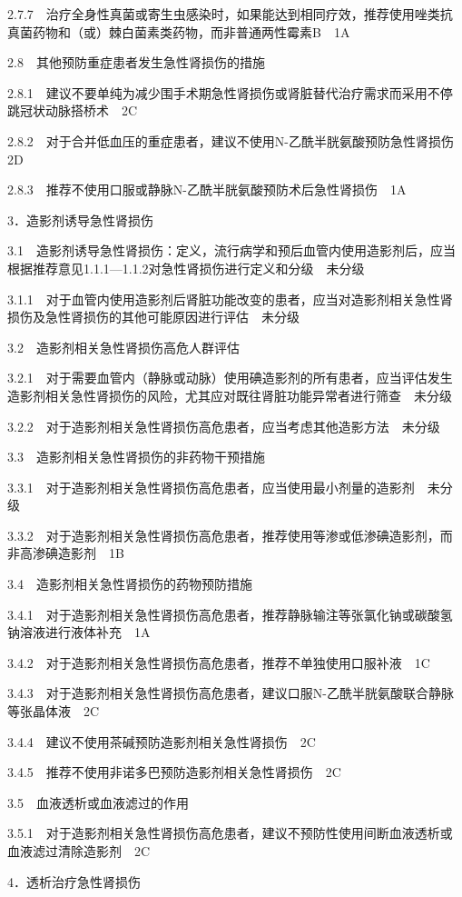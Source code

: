 2.7.7　治疗全身性真菌或寄生虫感染时，如果能达到相同疗效，推荐使用唑类抗真菌药物和（或）棘白菌素类药物，而非普通两性霉素B　1A

2.8　其他预防重症患者发生急性肾损伤的措施

2.8.1　建议不要单纯为减少围手术期急性肾损伤或肾脏替代治疗需求而采用不停跳冠状动脉搭桥术　2C

2.8.2　对于合并低血压的重症患者，建议不使用N-乙酰半胱氨酸预防急性肾损伤　2D

2.8.3　推荐不使用口服或静脉N-乙酰半胱氨酸预防术后急性肾损伤　1A

3．造影剂诱导急性肾损伤

3.1　造影剂诱导急性肾损伤：定义，流行病学和预后血管内使用造影剂后，应当根据推荐意见1.1.1---1.1.2对急性肾损伤进行定义和分级　未分级

3.1.1　对于血管内使用造影剂后肾脏功能改变的患者，应当对造影剂相关急性肾损伤及急性肾损伤的其他可能原因进行评估　未分级

3.2　造影剂相关急性肾损伤高危人群评估

3.2.1　对于需要血管内（静脉或动脉）使用碘造影剂的所有患者，应当评估发生造影剂相关急性肾损伤的风险，尤其应对既往肾脏功能异常者进行筛查　未分级

3.2.2　对于造影剂相关急性肾损伤高危患者，应当考虑其他造影方法　未分级

3.3　造影剂相关急性肾损伤的非药物干预措施

3.3.1　对于造影剂相关急性肾损伤高危患者，应当使用最小剂量的造影剂　未分级

3.3.2　对于造影剂相关急性肾损伤高危患者，推荐使用等渗或低渗碘造影剂，而非高渗碘造影剂　1B

3.4　造影剂相关急性肾损伤的药物预防措施

3.4.1　对于造影剂相关急性肾损伤高危患者，推荐静脉输注等张氯化钠或碳酸氢钠溶液进行液体补充　1A

3.4.2　对于造影剂相关急性肾损伤高危患者，推荐不单独使用口服补液　1C

3.4.3　对于造影剂相关急性肾损伤高危患者，建议口服N-乙酰半胱氨酸联合静脉等张晶体液　2C

3.4.4　建议不使用茶碱预防造影剂相关急性肾损伤　2C

3.4.5　推荐不使用非诺多巴预防造影剂相关急性肾损伤　2C

3.5　血液透析或血液滤过的作用

3.5.1　对于造影剂相关急性肾损伤高危患者，建议不预防性使用间断血液透析或血液滤过清除造影剂　2C

4．透析治疗急性肾损伤

